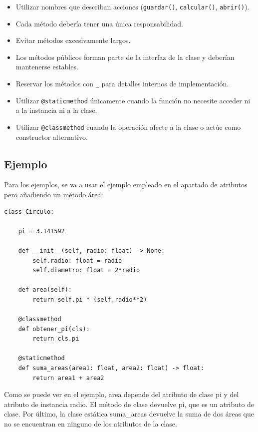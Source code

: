 \documentclass[11pt,a5paper,twoside]{book}
\begin{document}
\begin{itemize}
\item  Utilizar nombres que describan acciones ({\scriptsize \texttt{guardar()}}, {\scriptsize \texttt{calcular()}}, {\scriptsize \texttt{abrir()}}).
\item  Cada método debería tener una única responsabilidad.
\item  Evitar métodos excesivamente largos.
\item  Los métodos públicos forman parte de la interfaz de la clase y deberían mantenerse estables.
\item  Reservar los métodos con {\scriptsize \texttt{\_}} para detalles internos de implementación.
\item  Utilizar {\scriptsize \texttt{@staticmethod}} únicamente cuando la función no necesite acceder ni a la instancia ni a la clase.
\item  Utilizar {\scriptsize \texttt{@classmethod}} cuando la operación afecte a la clase o actúe como constructor alternativo.
\end{itemize}
\subsection{Ejemplo}
Para los ejemplos, se va a usar el ejemplo empleado en el apartado de atributos pero añadiendo un método área:

\newpage


\begin{tcolorbox}
\scriptsize
 \begin{verbatim}
class Circulo:
    
    pi = 3.141592
    
    def __init__(self, radio: float) -> None:
        self.radio: float = radio
        self.diametro: float = 2*radio

    def area(self):
        return self.pi * (self.radio**2)

    @classmethod
    def obtener_pi(cls):
        return cls.pi

    @staticmethod
    def suma_areas(area1: float, area2: float) -> float:
        return area1 + area2
\end{verbatim}
\end{tcolorbox}
Como se puede ver en el ejemplo, area depende del atributo de clase pi y del atributo de instancia radio. El método de clase devuelve pi, que es un atributo de clase. Por último, la clase estática suma\_areas devuelve la suma de dos áreas que no se encuentran en ninguno de los atributos de la clase.
\end{document}
